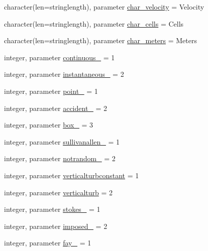 \begin{DoxyCompactItemize}
\item 
character(len=stringlength), parameter \mbox{\hyperlink{namespacemodulelagrangian_a10a4e31355ba7ebe61afd98d0002f7f1}{char\+\_\+velocity}} = \textquotesingle{}Velocity\textquotesingle{}
\item 
character(len=stringlength), parameter \mbox{\hyperlink{namespacemodulelagrangian_ad01950a51ef2bd2bbee9c87b29c24f4c}{char\+\_\+cells}} = \textquotesingle{}Cells\textquotesingle{}
\item 
character(len=stringlength), parameter \mbox{\hyperlink{namespacemodulelagrangian_a2fc2ba05f8d15170ba6f5b8ee32e7f7a}{char\+\_\+meters}} = \textquotesingle{}Meters\textquotesingle{}
\item 
integer, parameter \mbox{\hyperlink{namespacemodulelagrangian_a583bc715e00f8966a9ae3058886ddfc0}{continuous\+\_\+}} = 1
\item 
integer, parameter \mbox{\hyperlink{namespacemodulelagrangian_a3f74c96cc313910c329f98ea1f8aab63}{instantaneous\+\_\+}} = 2
\item 
integer, parameter \mbox{\hyperlink{namespacemodulelagrangian_a4610ec4d0d22c861a9bd320cdc15492c}{point\+\_\+}} = 1
\item 
integer, parameter \mbox{\hyperlink{namespacemodulelagrangian_a46e68ebc0ee20eacf75641e0c1545a88}{accident\+\_\+}} = 2
\item 
integer, parameter \mbox{\hyperlink{namespacemodulelagrangian_af48cfae0591278eb3f18e766c8343ab6}{box\+\_\+}} = 3
\item 
integer, parameter \mbox{\hyperlink{namespacemodulelagrangian_a84cf4506e77e543c0b17298a49143acb}{sullivanallen\+\_\+}} = 1
\item 
integer, parameter \mbox{\hyperlink{namespacemodulelagrangian_a3eab7b0601830df30aaa45c992c1293e}{notrandom\+\_\+}} = 2
\item 
integer, parameter \mbox{\hyperlink{namespacemodulelagrangian_a46ba4ae7e2308c820cee20ab67fd4c51}{verticalturbconstant}} = 1
\item 
integer, parameter \mbox{\hyperlink{namespacemodulelagrangian_a184500cd40a49c67488efd3e9aeb6621}{verticalturb}} = 2
\item 
integer, parameter \mbox{\hyperlink{namespacemodulelagrangian_a3011797e7a4d8206a22b6d1dfde9f335}{stokes\+\_\+}} = 1
\item 
integer, parameter \mbox{\hyperlink{namespacemodulelagrangian_a2560503c90b2d96a6ac21072b5d0c540}{imposed\+\_\+}} = 2
\item 
integer, parameter \mbox{\hyperlink{namespacemodulelagrangian_aad742257e00d56ef9a8edfcf2a6a709f}{fay\+\_\+}} = 1

\end{DoxyCompactItemize}
